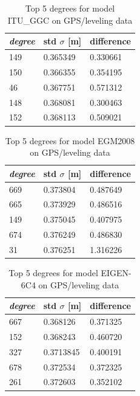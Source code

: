           
            \begin{table}[]
            	\centering
            	\caption{Top 5 degrees for model ITU\_GGC on GPS/leveling data}
            	\label{table:ggm_models}
            	\begin{tabular}{@{}lll@{}}
            		\toprule
            		\emph{degree} & std $\sigma$ [m]  & difference\\ \midrule
            		149 &0.365349&    0.330661\\
            		150 &0.366355&   0.354195\\
            		46 &0.367751 &  0.571312\\
            		148 &0.368081 &  0.300463\\
            		152 &0.368113  & 0.509021\\
            		\bottomrule
            		
            	\end{tabular}
            \end{table}
            
            
              \begin{table}[]
              	\centering
              	\caption{Top 5 degrees for model EGM2008 on GPS/leveling data}
              	\label{table:ggm_models}
              	\begin{tabular}{@{}lll@{}}
              		\toprule
              		\emph{degree} & std $\sigma$ [m]  & difference\\ \midrule
              		669 &0.373804&    0.487649\\
              		665 &0.373929&   0.486516\\
              		149 &0.375045 &  0.407975\\
              		674 &0.376249 &  0.486830\\
              		31 &0.376251  & 1.316226\\
              		\bottomrule
              		
              	\end{tabular}
              \end{table}
              
              \begin{table}
               	\centering
               	\caption{Top 5 degrees for model EIGEN-6C4 on GPS/leveling data}
               	\label{table:ggm_models}
               	\begin{tabular}{@{}lll@{}}
               		\toprule
               		\emph{degree} & std $\sigma$ [m]  & difference\\ \midrule
               		667 &0.368126&    0.371325\\
               		152 &0.368243&   0.460720\\
               		327 &0.3713845 &  0.400191\\
               		678 &0.372534 &  0.372325\\
               		261 &0.372603  & 0.352102\\
               		\bottomrule
               		
               	\end{tabular}
               \end{table}
        
